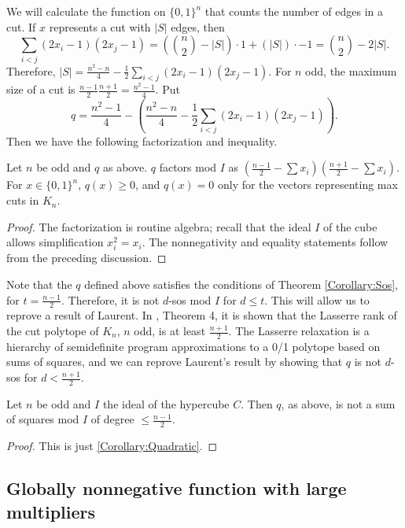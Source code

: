 We will calculate the function on $\{0,1\}^n$ that counts the number of edges in a cut. 
If $x$ represents a cut with $|S|$ edges, then 
$$\sum_{i < j} (2x_i-1)(2x_j-1) = \left({n \choose 2} - |S|\right)\cdot 1 + \left(|S|\right) \cdot -1 = {n \choose 2} - 2|S|.$$
 Therefore, $|S| = \frac{n^2-n}{4} - \frac{1}{2} \sum_{i < j} (2x_i-1)(2x_j-1)$. For $n$ odd, the maximum size of a cut is $\frac{n-1}{2}\frac{n+1}{2} = \frac{n^2-1}{4}$. Put 
$$q = \frac{n^2-1}{4} - \left(\frac{n^2-n}{4} - \frac{1}{2} \sum_{i < j} (2x_i-1)(2x_j-1) \right).$$ Then we have the following factorization and inequality.

\begin{proposition} \label{Proposition:CutFunction}
Let $n$ be odd and $q$ as above. $q$ factors mod $I$ as $ (\frac{n-1}{2} - \sum x_i)(\frac{n+1}{2} - \sum x_i)$. For $x \in \{0,1\}^n$, $q(x) \ge 0$, and $q(x) = 0$ only for the vectors representing max cuts in $K_n$.
\end{proposition}
\begin{proof}
The factorization is routine algebra; recall that the ideal $I$ of the cube allows simplification $x_i^2 = x_i$. The nonnegativity and equality statements follow from the preceding discussion.
\end{proof}

Note that the $q$ defined above satisfies the conditions of Theorem \ref{Corollary:Sos}, for $t = \frac{n-1}{2}$. Therefore, it is not $d$-sos mod $I$ for $d \le t$. This will allow us to reprove a result of Laurent. In \cite{moniquestuff}, Theorem 4, it is shown that the Lasserre rank of the cut polytope of $K_n$, $n$ odd, is at least $\frac{n+1}{2}$. The Lasserre relaxation is a hierarchy of semidefinite program approximations to a 0/1 polytope based on sums of squares, and we can reprove Laurent's result by showing that $q$ is not $d$-sos for $d < \frac{n+1}{2}$.

\begin{corollary}\label{Corollary:Cut}
Let $n$ be odd and $I$ the ideal of the hypercube $C$. Then $q$, as above, is not a sum of squares mod $I$ of degree $\le \frac{n-1}{2}$.
\end{corollary}
\begin{proof}
This is just \ref{Corollary:Quadratic}.
\end{proof}

\subsection{Globally nonnegative function with large multipliers}\label{Subsection:Hilbert}

